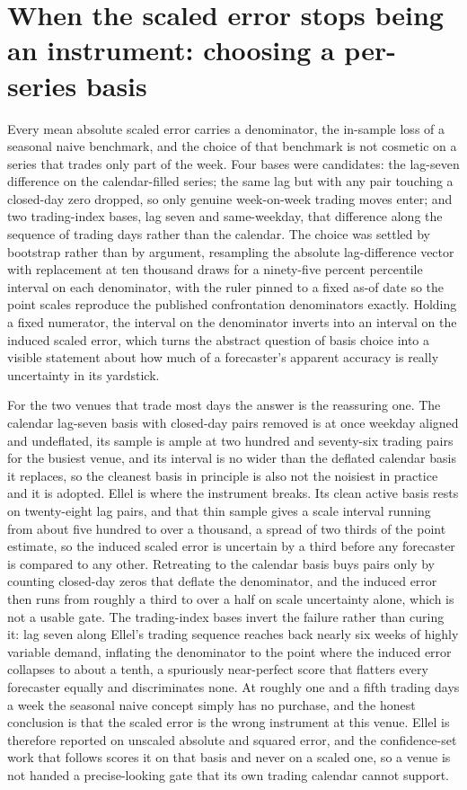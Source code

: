 \section{When the scaled error stops being an instrument: choosing a per-series basis}
\label{sec:scale-basis}

Every mean absolute scaled error carries a denominator, the in-sample loss of a seasonal naive
benchmark, and the choice of that benchmark is not cosmetic on a series that trades only part of
the week. Four bases were candidates: the lag-seven difference on the calendar-filled series;
the same lag but with any pair touching a closed-day zero dropped, so only genuine week-on-week
trading moves enter; and two trading-index bases, lag seven and same-weekday, that difference
along the sequence of trading days rather than the calendar. The choice was settled by
bootstrap rather than by argument, resampling the absolute lag-difference vector with
replacement at ten thousand draws for a ninety-five percent percentile interval on each
denominator, with the ruler pinned to a fixed as-of date so the point scales reproduce the
published confrontation denominators exactly. Holding a fixed numerator, the interval on the
denominator inverts into an interval on the induced scaled error, which turns the abstract
question of basis choice into a visible statement about how much of a forecaster's apparent
accuracy is really uncertainty in its yardstick.

For the two venues that trade most days the answer is the reassuring one. The calendar
lag-seven basis with closed-day pairs removed is at once weekday aligned and undeflated, its
sample is ample at two hundred and seventy-six trading pairs for the busiest venue, and its
interval is no wider than the deflated calendar basis it replaces, so the cleanest basis in
principle is also not the noisiest in practice and it is adopted. Ellel is where the instrument
breaks. Its clean active basis rests on twenty-eight lag pairs, and that thin sample gives a
scale interval running from about five hundred to over a thousand, a spread of two thirds of the
point estimate, so the induced scaled error is uncertain by a third before any forecaster is
compared to any other. Retreating to the calendar basis buys pairs only by counting closed-day
zeros that deflate the denominator, and the induced error then runs from roughly a third to over
a half on scale uncertainty alone, which is not a usable gate. The trading-index bases invert
the failure rather than curing it: lag seven along Ellel's trading sequence reaches back nearly
six weeks of highly variable demand, inflating the denominator to the point where the induced
error collapses to about a tenth, a spuriously near-perfect score that flatters every forecaster
equally and discriminates none. At roughly one and a fifth trading days a week the seasonal
naive concept simply has no purchase, and the honest conclusion is that the scaled error is the
wrong instrument at this venue. Ellel is therefore reported on unscaled absolute and squared
error, and the confidence-set work that follows scores it on that basis and never on a scaled
one, so a venue is not handed a precise-looking gate that its own trading calendar cannot
support.
